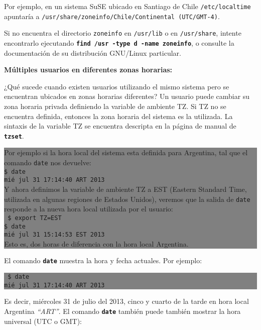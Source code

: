 \documentclass[12pt]{article}
\begin{document}
Por ejemplo, en un sistema SuSE ubicado en Santiago de Chile \texttt{/etc/localtime} apuntaría
a \texttt{/usr/share/zoneinfo/Chile/Continental (UTC/GMT-4)}.

Si no encuentra el directorio \texttt{zoneinfo} en \texttt{/usr/lib} o en \texttt{/usr/share}, 
intente encontrarlo ejecutando \texttt{\textbf{find /usr -type d -name zoneinfo}}, o consulte 
la documentación de su distribución GNU/Linux particular.

\textbf{Múltiples usuarios en diferentes zonas horarias:}

¿Qué sucede cuando existen usuarios utilizando el mismo sistema pero se encuentran ubicados en
zonas horarias diferentes?
Un usuario puede cambiar su zona horaria privada definiendo la variable de ambiente TZ.
Si TZ no se encuentra definida, entonces la zona horaria del sistema es la utilizada.
La sintaxis de la variable TZ se encuentra descripta en la página de manual de \texttt{\textbf{tzset}}.


\colorbox{grey}{\parbox[t]{0.95\linewidth}{ \vspace*{0.5cm} { 
Por ejemplo si la hora local del sistema esta definida para Argentina, tal que 
el comando \texttt{date} nos devuelve: \\
{\tt\$ date \\
mié jul 31 17:14:40 ART 2013} \\
Y ahora definimos la variable de ambiente TZ a EST (Eastern Standard Time, utilizada en 
algunas regiones de Estados Unidos), veremos que la salida de \texttt{date} responde 
a la nueva hora local utilizada por el usuario: \\
{\tt
\$ export TZ=EST \\
\$ date \\
mié jul 31 15:14:53 EST 2013 \\
} 
Esto es, dos horas de diferencia con la hora local Argentina. 
 } \vspace*{0.5cm} } } 


El comando \texttt{\textbf{date}} muestra la hora y fecha actuales. Por ejemplo:



\colorbox{grey}{\parbox[t]{0.95\linewidth}{ \vspace*{0.5cm} {\tt 
\$ date \\
mié jul 31 17:14:40 ART 2013
 } \vspace*{0.5cm} } } 

Es decir, miércoles 31 de julio del 2013, cinco y cuarto de la tarde en hora local Argentina  \textit{``ART''}.
El comando \texttt{\textbf{date}} también puede también mostrar la hora universal (UTC o GMT): 
\end{document}
